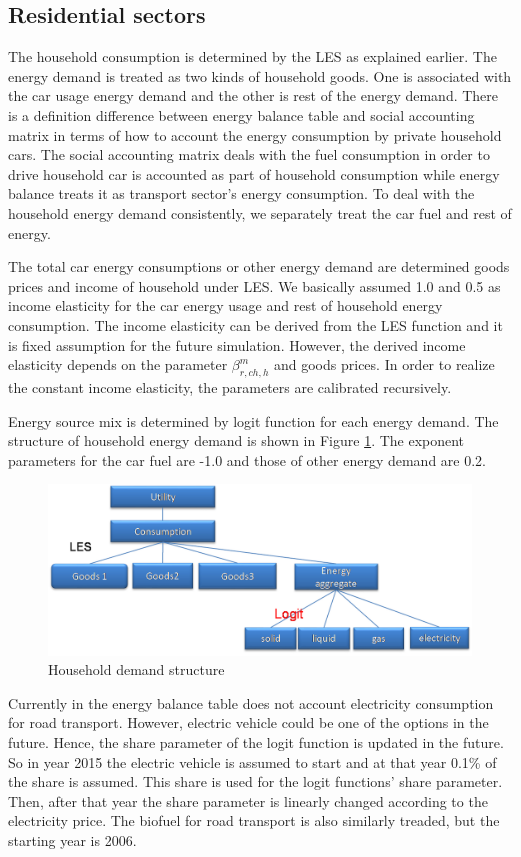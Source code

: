 \documentclass[10pt,a4paper,titlepage,dvipdfmx]{book}
\begin{document}
\subsection{\label{subsec:ResSec}{Residential sectors}}

The household consumption is determined by the LES as explained earlier. The energy demand is treated as two kinds of household goods. One is associated with the car usage energy demand and the other is rest of the energy demand. There is a definition difference between energy balance table and social accounting matrix in terms of how to account the energy consumption by private household cars. The social accounting matrix deals with the fuel consumption in order to drive household car is accounted as part of household consumption while energy balance treats it as transport sector's energy consumption. To deal with the household energy demand consistently, we separately treat the car fuel and rest of energy.

The total car energy consumptions or other energy demand are determined goods prices and income of household under LES. We basically assumed 1.0 and 0.5 as income elasticity for the car energy usage and rest of household energy consumption. The income elasticity can be derived from the LES function and it is fixed assumption for the future simulation. However, the derived income elasticity depends on the parameter $\beta _{r,ch,h}^{m}$ and goods prices. In order to realize the constant income elasticity, the parameters are calibrated recursively.

Energy source mix is determined by logit function for each energy demand. The structure of household energy demand is shown in Figure \ref{fig:HouDemStr}. The exponent parameters for the car fuel are -1.0 and those of other energy demand are 0.2.
\begin{figure}
\includegraphics[width=1\textwidth]{fig/image20.png}
\caption{Household demand structure\label{fig:HouDemStr}}
\end{figure}
Currently in the energy balance table does not account electricity consumption for road transport. However, electric vehicle could be one of the options in the future. Hence, the share parameter of the logit function is updated in the future. So in year 2015 the electric vehicle is assumed to start and at that year 0.1\% of the share is assumed. This share is used for the logit functions' share parameter. Then, after that year the share parameter is linearly changed according to the electricity price. The biofuel for road transport is also similarly treaded, but the starting year is 2006.
\end{document}
